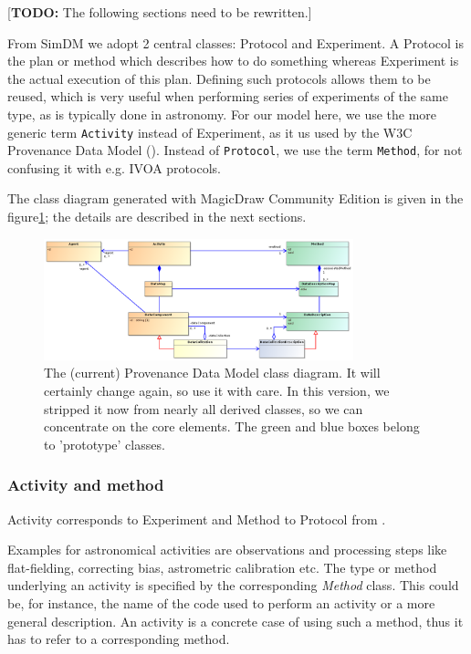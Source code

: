 \documentclass[11pt,a4paper]{ivoa}
\newcommand{\TODO}[1]{\noindent \textcolor{todocolor}{[\textbf{TODO:} #1]}}
\begin{document}
\TODO{The following sections need to be rewritten.}

From SimDM we adopt 2 central classes: Protocol and Experiment.  A Protocol is the plan or method
which describes how to do something whereas Experiment is the actual execution of
this plan. Defining such protocols allows them to be reused, which is very useful when performing series of experiments of the same type, as is typically done in astronomy. For our model here, we use the more generic term
\texttt{Activity} instead of Experiment, as it us used by the W3C Provenance Data Model (\cite{std:W3CProvDM}). Instead of \texttt{Protocol}, we use the term \texttt{Method}, 
for not confusing it with e.g. IVOA protocols.

The class diagram generated with MagicDraw Community Edition is given in the figure\ref{fig:classes-prototypes}; the details are described in the next sections.

\begin{figure}
\centering
\includegraphics[width=0.8\textwidth]{ProvDM-classdiagram-prototypes.png}
\caption{The (current) Provenance Data Model
class diagram. It will certainly change again, so use it with care. In this version, we stripped it now from nearly all derived classes, so we can concentrate on the core elements. The green and blue boxes belong to 'prototype' classes.}
\label{fig:classes-prototypes}
\end{figure}

\subsubsection{Activity and method}
Activity corresponds to Experiment and Method to Protocol from \cite{std:SimDM}.

Examples for astronomical activities are observations and processing steps like
flat-fielding, correcting bias, astrometric calibration etc. The type or method
underlying an activity is specified by the corresponding \emph{Method} class.
This could be, for instance, the name of the code used to perform an activity or a more general description. An activity is a concrete case of using such a method, thus it has to refer to a corresponding method. 
\end{document}
